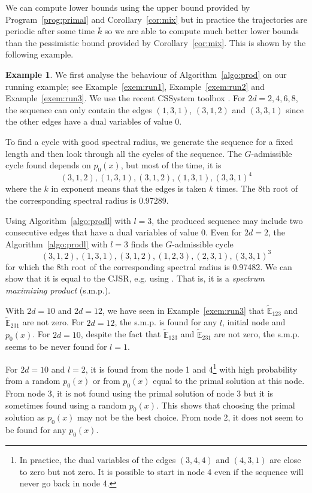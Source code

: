 \documentclass{sig-alternate-05-2015}
\newcommand{\1}{\mathbf{1}}
\theoremstyle{definition}
\newtheorem{myexem}{Example}
\newcommand{\G}{G}
\newcommand{\pE}{\widetilde{\mathbb{E}}}
\begin{document}
We can compute lower bounds using the upper bound provided by Program~\ref{prog:primal} and Corollary~\ref{cor:mix}
but in practice the trajectories are periodic after some time $\bar{k}$ so we are able to compute
much better lower bounds than the pessimistic bound provided by Corollary~\ref{cor:mix}.
This is shown by the following example.

\begin{myexem}
  \label{exem:run4}
  We first analyse the behaviour of Algorithm~\ref{algo:prod}
  on our running example; see Example~\ref{exem:run1}, Example~\ref{exem:run2} and Example~\ref{exem:run3}.
  We use the recent CSSystem toolbox \cite{cambier2015cssystem}.
  For $2d = 2,4,6,8$, the sequence can only contain the edges $(1,3,1)$, $(3,1,2)$ and $(3,3,1)$
  since the other edges have a dual variables of value 0.

  To find a cycle with good spectral radius, we generate the sequence for a fixed length and then look through all the cycles of the sequence.
  The $\G$-admissible cycle found depends on $p_0(x)$, but most of the time, it is
  \[ (3,1,2),(1,3,1),(3,1,2),(1,3,1),(3,3,1)^4 \]
  where the $k$ in exponent means that the edges is taken $k$ times.
  The 8th root of the corresponding spectral radius is 0.97289.

  Using Algorithm~\ref{algo:prodl} with $l = 3$, the produced sequence may include two consecutive edges that have a dual variables of value 0.
  Even for $2d = 2$, the Algorithm~\ref{algo:prodl} with $l = 3$ finds the $\G$-admissible cycle
  \[ (3,1,2),(1,3,1),(3,1,2),(1,2,3),(2,3,1),(3,3,1)^3 \]
  for which the 8th root of the corresponding spectral radius is 0.97482.
  We can show that it is equal to the CJSR, e.g. using \cite{guglielmi2008algorithm}.
  That is, it is a \emph{spectrum maximizing product} (s.m.p.).

  With $2d = 10$ and $2d = 12$, we have seen in Example~\ref{exem:run3} that $\pE_{123}$ and $\pE_{231}$ are not zero.
  For $2d = 12$, the s.m.p. is found for any $l$, initial node and $p_0(x)$.
  For $2d = 10$, despite the fact that $\pE_{123}$ and $\pE_{231}$ are not zero,
  the s.m.p. seems to be never found for $l = 1$.

  For $2d = 10$ and $l = 2$, it is found from the node 1 and 4\footnote{In practice, the dual variables of the edges $(3,4,4)$ and $(4,3,1)$ are close to zero but not zero. It is possible to start in node 4 even if the sequence will never go back in node 4.}
  with high probability from a random $p_0(x)$ or from $p_0(x)$ equal to the primal solution at this node.
  From node 3, it is not found using the primal solution of node 3 but it is sometimes found using a random $p_0(x)$.
  This shows that choosing the primal solution as $p_0(x)$ may not be the best choice.
  From node 2, it does not seem to be found for any $p_0(x)$.


\end{myexem}
\end{document}
